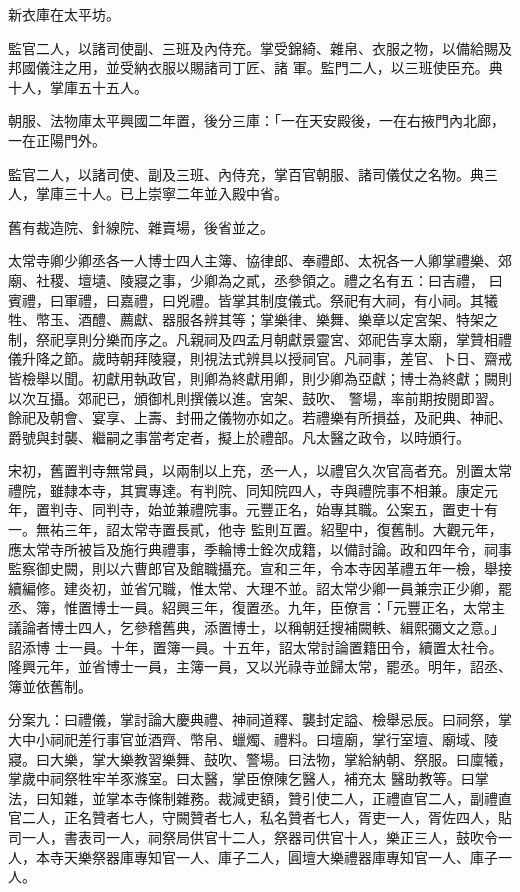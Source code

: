 \begin{pinyinscope}
 新衣庫在太平坊。



 監官二人，以諸司使副、三班及內侍充。掌受錦綺、雜帛、衣服之物，以備給賜及邦國儀注之用，並受納衣服以賜諸司丁匠、諸
 軍。監門二人，以三班使臣充。典十人，掌庫五十五人。



 朝服、法物庫太平興國二年置，後分三庫：「一在天安殿後，一在右掖門內北廊，一在正陽門外。



 監官二人，以諸司使、副及三班、內侍充，掌百官朝服、諸司儀仗之名物。典三人，掌庫三十人。已上崇寧二年並入殿中省。



 舊有裁造院、針線院、雜賣場，後省並之。



 太常寺卿少卿丞各一人博士四人主簿、協律郎、奉禮郎、太祝各一人卿掌禮樂、郊廟、社稷、壇壝、陵寢之事，少卿為之貳，丞參領之。禮之名有五：曰吉禮，
 曰賓禮，曰軍禮，曰嘉禮，曰兇禮。皆掌其制度儀式。祭祀有大祠，有小祠。其犧牲、幣玉、酒醴、薦獻、器服各辨其等；掌樂律、樂舞、樂章以定宮架、特架之制，祭祀享則分樂而序之。凡親祠及四孟月朝獻景靈宮、郊祀告享太廟，掌贊相禮儀升降之節。歲時朝拜陵寢，則視法式辨具以授祠官。凡祠事，差官、卜日、齋戒皆檢舉以聞。初獻用執政官，則卿為終獻用卿，則少卿為亞獻；博士為終獻；闕則以次互攝。郊祀已，頒御札則撰儀以進。宮架、鼓吹、
 警場，率前期按閱即習。餘祀及朝會、宴享、上壽、封冊之儀物亦如之。若禮樂有所損益，及祀典、神祀、爵號與封襲、繼嗣之事當考定者，擬上於禮部。凡太醫之政令，以時頒行。



 宋初，舊置判寺無常員，以兩制以上充，丞一人，以禮官久次官高者充。別置太常禮院，雖隸本寺，其實專達。有判院、同知院四人，寺與禮院事不相兼。康定元年，置判寺、同判寺，始並兼禮院事。元豐正名，始專其職。公案五，置吏十有一。無祐三年，詔太常寺置長貳，他寺
 監則互置。紹聖中，復舊制。大觀元年，應太常寺所被旨及施行典禮事，季輪博士銓次成籍，以備討論。政和四年令，祠事監察御史闕，則以六曹郎官及館職攝充。宣和三年，令本寺因革禮五年一檢，舉接續編修。建炎初，並省冗職，惟太常、大理不並。詔太常少卿一員兼宗正少卿，罷丞、簿，惟置博士一員。紹興三年，復置丞。九年，臣僚言：「元豐正名，太常主議論者博士四人，乞參稽舊典，添置博士，以稱朝廷搜補闕軼、緝熙彌文之意。」詔添博
 士一員。十年，置簿一員。十五年，詔太常討論置籍田令，續置太社令。隆興元年，並省博士一員，主簿一員，又以光祿寺並歸太常，罷丞。明年，詔丞、簿並依舊制。



 分案九：曰禮儀，掌討論大慶典禮、神祠道釋、襲封定謚、檢舉忌辰。曰祠祭，掌大中小祠祀差行事官並酒齊、幣帛、蠟燭、禮料。曰壇廟，掌行室壇、廟域、陵寢。曰大樂，掌大樂教習樂舞、鼓吹、警場。曰法物，掌給納朝、祭服。曰廩犧，掌歲中祠祭牲牢羊豕滌室。曰太醫，掌臣僚陳乞醫人，補充太
 醫助教等。曰掌法，曰知雜，並掌本寺條制雜務。裁減吏額，贊引使二人，正禮直官二人，副禮直官二人，正名贊者七人，守闕贊者七人，私名贊者七人，胥吏一人，胥佐四人，貼司一人，書表司一人，祠祭局供官十二人，祭器司供官十人，樂正三人，鼓吹令一人，本寺天樂祭器庫專知官一人、庫子二人，圓壇大樂禮器庫專知官一人、庫子一人。




\end{pinyinscope}
